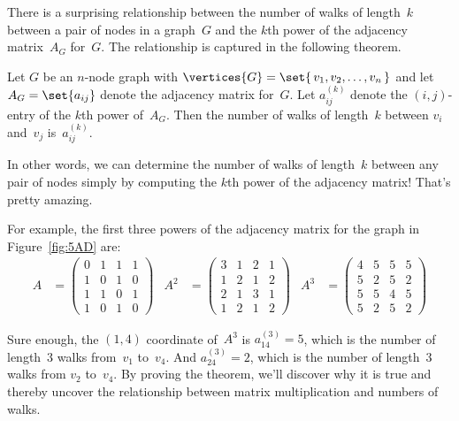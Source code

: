 There is a surprising relationship between the number of walks of
length~$k$ between a pair of nodes in a graph~$G$ and the $k$th power
of the adjacency matrix~$A_G$ for~$G$.  The relationship is captured
in the following theorem.

\begin{theorem}\label{thm:5AE}
Let $G$ be an $n$-node graph with $\vertices{G} = \set{\, v_1, v_2, \dots,
v_n\, }$ and let $A_G = \set{ a_{ij} }$ denote the adjacency matrix
for~$G$.  Let $a_{ij}^{(k)}$ denote the $(i, j)$-entry of the $k$th
power of~$A_G$.  Then the number of walks of length~$k$ between $v_i$
and~$v_j$ is~$a_{ij}^{(k)}$.
\end{theorem}

In other words, we can determine the number of walks of length~$k$
between any pair of nodes simply by computing the $k$th power of the
adjacency matrix!  That's pretty amazing.

For example, the first three powers of the adjacency matrix for the
graph in Figure~\ref{fig:5AD} are:
\begin{align*}
    A &= \begin{pmatrix}
            0 & 1 & 1 & 1 \\
            1 & 0 & 1 & 0 \\
            1 & 1 & 0 & 1 \\
            1 & 0 & 1 & 0
         \end{pmatrix} & %
  A^2 &= \begin{pmatrix}
            3 & 1 & 2 & 1 \\
            1 & 2 & 1 & 2 \\
            2 & 1 & 3 & 1 \\
            1 & 2 & 1 & 2
         \end{pmatrix} & %
  A^3 &= \begin{pmatrix}
            4 & 5 & 5 & 5 \\
            5 & 2 & 5 & 2 \\
            5 & 5 & 4 & 5 \\
            5 & 2 & 5 & 2
         \end{pmatrix}
\end{align*}

Sure enough, the $(1, 4)$ coordinate of~$A^3$ is $a_{14}^{(3)} = 5$,
which is the number of length~3 walks from~$v_1$ to~$v_4$.  And
$a_{24}^{(3)} = 2$, which is the number of length~3 walks from $v_2$
to~$v_4$.  By proving the theorem, we'll discover why it is true and
thereby uncover the relationship between matrix multiplication and
numbers of walks.


